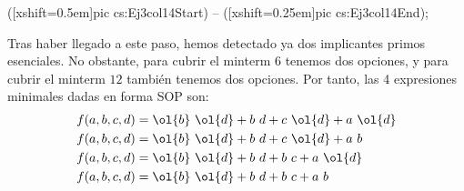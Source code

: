 \begin{ejercicio}
\begin{description}
\begin{table}[H]
              ([xshift=0.5em]pic cs:Ej3col14Start) -- ([xshift=0.25em]pic cs:Ej3col14End);
        \end{table}

        Tras haber llegado a este paso, hemos detectado ya dos implicantes primos esenciales. No obstante, para cubrir el minterm $6$ tenemos dos opciones,
        y para cubrir el minterm $12$ también tenemos dos opciones. Por tanto, las 4 expresiones minimales dadas en forma SOP son:
        \begin{align*}
            f(a,b,c,d) &= \ol{b}~\ol{d} + b~d + c~\ol{d} + a~\ol{d}\\
            f(a,b,c,d) &= \ol{b}~\ol{d} + b~d + c~\ol{d} + a~b\\
            f(a,b,c,d) &= \ol{b}~\ol{d} + b~d + b~c + a~\ol{d}\\
            f(a,b,c,d) &= \ol{b}~\ol{d} + b~d + b~c + a~b
        \end{align*}
    \end{description}
\end{ejercicio}











































































